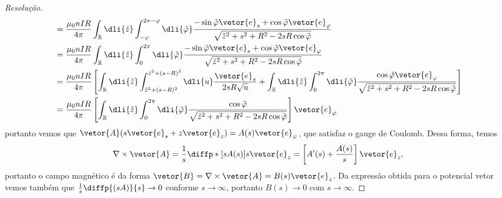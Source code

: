 \begin{proof}[Resolução]
\begin{align*}
                              &= \frac{\mu_0 n IR}{4\pi}\int_{\mathbb{R}} \dli{\tilde{z}} \int_{-\varphi}^{2\pi - \varphi}\dli{\tilde{\varphi}} \frac{-\sin\tilde\varphi \vetor{e}_s + \cos\tilde\varphi\vetor{e}_\varphi}{\sqrt{\tilde{z}^2 + s^2 + R^2 - 2 s R \cos\tilde{\varphi}}}\\
                              &= \frac{\mu_0 n IR}{4\pi}\int_{\mathbb{R}} \dli{\tilde{z}} \int_{0}^{2\pi}\dli{\tilde{\varphi}} \frac{-\sin\tilde\varphi \vetor{e}_s + \cos\tilde\varphi\vetor{e}_\varphi}{\sqrt{\tilde{z}^2 + s^2 + R^2 - 2 s R \cos\tilde{\varphi}}}\\
                              &= \frac{\mu_0 n IR}{4\pi} \left[\int_{\mathbb{R}}\dli{\tilde{z}}\int_{\tilde{z}^2 + (s - R)^2}^{\tilde{z}^2 + (s - R)^2}\dli{u} \frac{\vetor{e}_s}{2sR\sqrt{u}} + \int_{\mathbb{R}} \dli{\tilde{z}} \int_{0}^{2\pi}\dli{\tilde{\varphi}} \frac{\cos\tilde\varphi\vetor{e}_\varphi}{\sqrt{\tilde{z}^2 + s^2 + R^2 - 2 s R \cos\tilde{\varphi}}}
                              \right]\\
                              &= \frac{\mu_0 n IR}{4\pi}\left[\int_{\mathbb{R}} \dli{\tilde{z}} \int_{0}^{2\pi}\dli{\tilde{\varphi}} \frac{\cos\tilde\varphi}{\sqrt{\tilde{z}^2 + s^2 + R^2 - 2 s R \cos\tilde{\varphi}}}\right]\vetor{e}_\varphi
    \end{align*}
    portanto vemos que \(\vetor{A}(s \vetor{e}_s + z\vetor{e}_z) = A(s)\vetor{e}_\varphi\), que satisfaz o gauge de Coulomb. Dessa forma, temos
    \begin{equation*}
        \nabla\times \vetor{A} = \frac{1}{s} \diffp*{\left[s A(s)\right]}{s} \vetor{e}_z = \left[A'(s) + \frac{A(s)}{s}\right]\vetor{e}_z,
    \end{equation*}
    portanto o campo magnético é da forma \(\vetor{B} = \nabla\times \vetor{A} = B(s) \vetor{e}_z\). Da expressão obtida para o potencial vetor vemos também que \(\frac{1}{s}\diffp{(s A)}{s} \to 0\) conforme \(s \to \infty\), portanto \(B(s) \to 0\) com \(s \to \infty\).


\end{proof}
